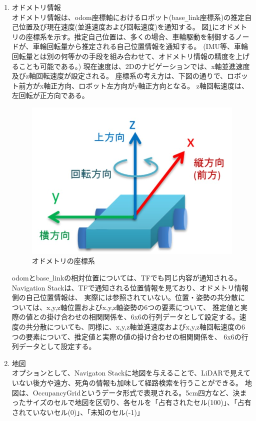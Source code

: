 \begin{enumerate}
  \item オドメトリ情報\\
  オドメトリ情報は、odom座標軸におけるロボット(base\verb|_|link座標系)の推定自己位置及び現在速度(並進速度および回転速度)を通知する。
  図\ref{auto:navstack:odometry}にオドメトリの座標系を示す。推定自己位置は、多くの場合、車輪駆動を制御するノードが、車輪回転量から推定される自己位置情報を通知する。
  (IMU等、車輪回転量とは別の何等かの手段を組み合わせて、オドメトリ情報の精度を上げることも可能である。)
  現在速度は、2Dのナビゲーションでは、x軸並進速度及びz軸回転速度が設定される。
  座標系の考え方は、下図の通りで、ロボット前方がx軸正方向、ロボット左方向がy軸正方向となる。
  z軸回転速度は、左回転が正方向である。
  \begin{figure}[h]
    \begin{center}
      \includegraphics[width=.8\linewidth]{img/auto_12.jpg}
      \caption{オドメトリの座標系}
      \label{auto:navstack:odometry}
    \end{center}
  \end{figure}
  odomとbase\verb|_|linkの相対位置については、TFでも同じ内容が通知される。
  Navigation Stackは、TFで通知される位置情報を見ており、オドメトリ情報側の自己位置情報は、
  実際には参照されていない。位置・姿勢の共分散については、x,y,z軸位置およびx,y,z軸姿勢の6つの要素について、
  推定値と実際の値との掛け合わせの相関関係を、6x6の行列データとして設定する。速度の共分散についても、同様に、x,y,z軸並進速度およびx,y,z軸回転速度の6つの要素について、推定値と実際の値の掛け合わせの相関関係を、
  6x6の行列データとして設定する。
  \item 地図\\
  オプションとして、Navigaton Stackに地図を与えることで、LiDARで見えていない後方や遠方、死角の情報も加味して経路検索を行うことができる。
  地図は、OccupancyGridというデータ形式で表現される。5cm四方など、決まったサイズのセルで地図を区切り、各セルを「占有されたセル(100)」、「占有されていないセル(0)」、「未知のセル(-1)」

\end{enumerate}
